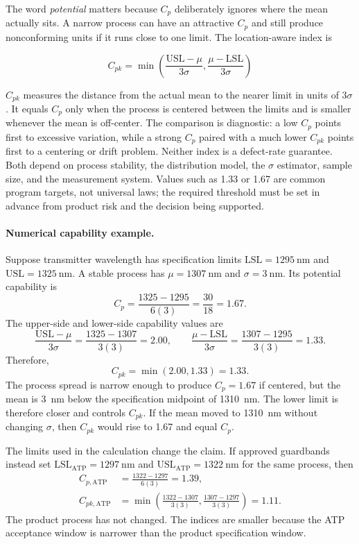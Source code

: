 The word \emph{potential} matters because $C_p$ deliberately ignores where the
mean actually sits. A narrow process can have an attractive $C_p$ and still
produce nonconforming units if it runs close to one limit. The location-aware
index is

\begin{equation}
C_{pk}=
\min\left(
\frac{\mathrm{USL}-\mu}{3\sigma},
\frac{\mu-\mathrm{LSL}}{3\sigma}
\right)
\end{equation}

$C_{pk}$ measures the distance from the actual mean to the nearer limit in
units of $3\sigma$. It equals $C_p$ only when the process is centered between
the limits and is smaller whenever the mean is off-center. The comparison is
diagnostic: a low $C_p$ points first to excessive variation, while a strong
$C_p$ paired with a much lower $C_{pk}$ points first to a centering or drift
problem. Neither index is a defect-rate guarantee. Both depend on process
stability, the distribution model, the $\sigma$ estimator, sample size, and the
measurement system. Values such as 1.33 or 1.67 are common program targets, not
universal laws; the required threshold must be set in advance from product risk
and the decision being supported.

\paragraph{Numerical capability example.}
Suppose transmitter wavelength has specification limits
$\mathrm{LSL}=1295~\mathrm{nm}$ and
$\mathrm{USL}=1325~\mathrm{nm}$. A stable process has
$\mu=1307~\mathrm{nm}$ and $\sigma=3~\mathrm{nm}$. Its potential capability is
\[
C_p=\frac{1325-1295}{6(3)}
   =\frac{30}{18}
   =1.67.
\]
The upper-side and lower-side capability values are
\[
\frac{\mathrm{USL}-\mu}{3\sigma}
=\frac{1325-1307}{3(3)}
=2.00,
\qquad
\frac{\mu-\mathrm{LSL}}{3\sigma}
=\frac{1307-1295}{3(3)}
=1.33.
\]
Therefore,
\[
C_{pk}=\min(2.00,1.33)=1.33.
\]
The process spread is narrow enough to produce $C_p=1.67$ if centered, but the
mean is 3~nm below the specification midpoint of 1310~nm. The lower limit is
therefore closer and controls $C_{pk}$. If the mean moved to 1310~nm without
changing $\sigma$, then $C_{pk}$ would rise to 1.67 and equal $C_p$.

The limits used in the calculation change the claim. If approved guardbands
instead set $\mathrm{LSL}_{\mathrm{ATP}}=1297~\mathrm{nm}$ and
$\mathrm{USL}_{\mathrm{ATP}}=1322~\mathrm{nm}$ for the same process, then
\begin{align*}
C_{p,\mathrm{ATP}}
&=\frac{1322-1297}{6(3)}=1.39,\\
C_{pk,\mathrm{ATP}}
&=\min\left(\frac{1322-1307}{3(3)},
            \frac{1307-1297}{3(3)}\right)=1.11.
\end{align*}
The product process has not changed. The indices are smaller because the ATP
acceptance window is narrower than the product specification window.

